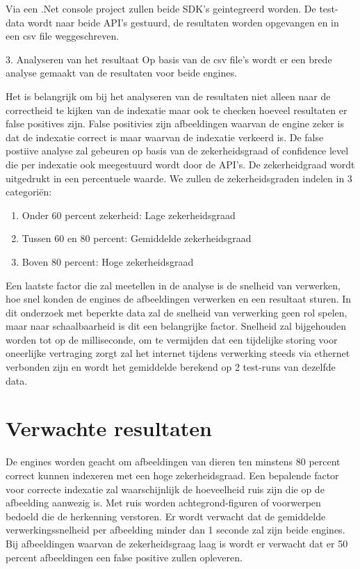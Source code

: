 Via een .Net console project zullen beide SDK's geintegreerd worden. De test-data wordt naar beide API's gestuurd, de resultaten worden opgevangen en in een csv file weggeschreven.

3. Analyseren van het resultaat
\linebreak
Op basis van de csv file's wordt er een brede analyse gemaakt van de resultaten voor beide engines.

Het is belangrijk om bij het analyseren van de resultaten niet alleen naar de correctheid te kijken van de indexatie maar ook te checken hoeveel resultaten er false positives zijn. False positivies zijn afbeeldingen waarvan de engine zeker is dat de indexatie correct is maar waarvan de indexatie verkeerd is.
De false postiive analyse zal gebeuren op basis van de zekerheidsgraad of confidence level die per indexatie ook meegestuurd wordt door de API's. De zekerheidgraad wordt uitgedrukt in een percentuele waarde. We zullen de zekerheidsgraden indelen in 3 categoriën:

\begin{enumerate}
    \item Onder 60 percent zekerheid: Lage zekerheidsgraad
    \item Tussen 60 en 80 percent: Gemiddelde zekerheidsgraad
    \item Boven 80 percent: Hoge zekerheidsgraad
\end{enumerate}

Een laatste factor die zal meetellen in de analyse is de snelheid van verwerken, hoe snel konden de engines de afbeeldingen verwerken en een resultaat sturen. In dit onderzoek met beperkte data zal de snelheid van verwerking geen rol spelen, maar naar schaalbaarheid is dit een belangrijke factor.
Snelheid zal bijgehouden worden tot op de milliseconde, om te vermijden dat een tijdelijke storing voor oneerlijke vertraging zorgt zal het internet tijdens verwerking steeds via ethernet verbonden zijn en wordt het gemiddelde berekend op 2 test-runs van dezelfde data.

\section{Verwachte resultaten}
\label{sec:verwachte_resultaten}
De engines worden geacht om afbeeldingen van dieren ten minstens 80 percent correct kunnen indexeren met een hoge zekerheidsgraad. Een bepalende factor voor correcte indexatie zal waarschijnlijk de hoeveelheid ruis zijn die op de afbeelding aanwezig is. Met ruis worden achtegrond-figuren of voorwerpen bedoeld die de herkenning verstoren.
Er wordt verwacht dat de gemiddelde verwerkingssnelheid per afbeelding minder dan 1 seconde zal zijn beide engines.
Bij afbeeldingen waarvan de zekerheidsgraag laag is wordt er verwacht dat er 50 percent afbeeldingen een false positive zullen opleveren.

